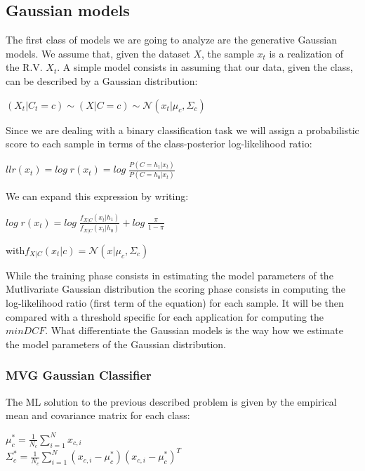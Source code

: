 \documentclass[10pt, a4paper, twocolumn]{article} %
\begin{document}
\subsection{Gaussian models}
The first class of models we are going to analyze are the generative Gaussian models. We assume that,
given the dataset $X$, the sample $x_{t}$ is a realization of the R.V. $X_{t}$. A simple
model consists in assuming that our data, given the class, can be described by a Gaussian distribution:
\begin{center}
	\begin{math}
		(X_{t}|C_{t}=c) \sim (X|C=c) \sim \mathcal{N} (x_{t}|\mu_{c},\Sigma_{c})
	\end{math}
\end{center}
Since we are dealing with a binary classification task 
we will assign a probabilistic score to each sample in terms of the class-posterior 
log-likelihood ratio:
\begin{center}
	\begin{math}
		llr(x_t)=log\;r(x_{t}) = log\;\frac{P(C = h_{1}|x_{t})}{P(C = h_{0}|x_{t})}
	\end{math}
\end{center}
We can expand this expression by writing:
\begin{center}
	$log\;r(x_{t}) = log\;\frac{f_{X|C}(x_{t}|h_{1})}{f_{X|C}(x_{t}|h_{0})} + log\;\frac{\pi}{1-\pi}$
\end{center}
\begin{center}
	with\;$ f_{X|C}(x_{t}|c) = \mathcal{N}(x|\mu_c,\Sigma_c)$
\end{center}
While the training phase consists in estimating the model parameters of the Mutlivariate Gaussian
distribution the scoring phase
consists in computing the log-likelihood ratio (first term of the equation) for each sample. 
It will be then compared with  a threshold specific for each application for computing 
the $minDCF$. What differentiate the Gaussian models is the way how we estimate the
model parameters of the Gaussian distribution.

\subsubsection{MVG Gaussian Classifier}
The ML solution to the previous described problem is given by the empirical mean and covariance
matrix for each class:
\begin{center}
	$\mu_{c}^* = \frac{1}{N_c}\sum_{i=1}^{N}x_{c,i}$ \\
	$\Sigma_c^* = \frac{1}{N_c}\sum_{i=1}^{N}(x_{c,i}-\mu_c^*)(x_{c,i}-\mu_c^*)^T$
\end{center}
\end{document}
